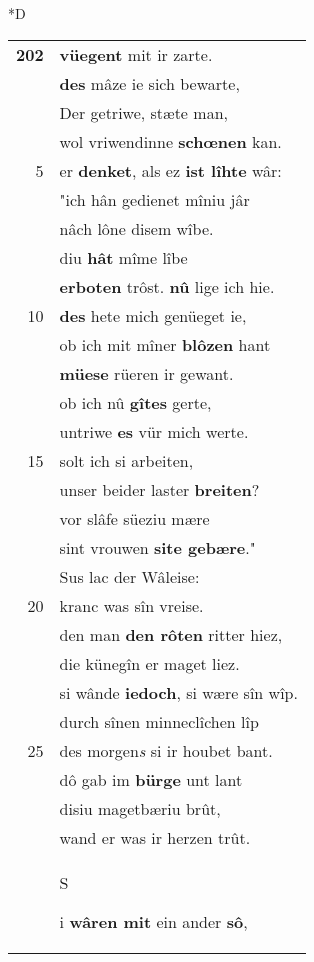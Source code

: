 \documentclass[8pt,a4paper,notitlepage]{article}
\begin{document}
\begin{table}[ht]
\begin{minipage}[t]{0.5\linewidth}
\small
\begin{center}*D
\end{center}
\begin{tabular}{rl}
\textbf{202} & \textbf{vüegent} mit ir zarte.\\ 
 & \textbf{des} mâze ie sich bewarte,\\ 
 & Der getriwe, stæte man,\\ 
 & wol vriwendinne \textbf{schœnen} kan.\\ 
5 & er \textbf{denket}, als ez \textbf{ist lîhte} wâr:\\ 
 & "ich hân gedienet mîniu jâr\\ 
 & nâch lône disem wîbe.\\ 
 & diu \textbf{hât} mîme lîbe\\ 
 & \textbf{erboten} trôst. \textbf{nû} lige ich hie.\\ 
10 & \textbf{des} hete mich genüeget ie,\\ 
 & ob ich mit mîner \textbf{blôzen} hant\\ 
 & \textbf{müese} rüeren ir gewant.\\ 
 & ob ich nû \textbf{gîtes} gerte,\\ 
 & untriwe \textbf{es} vür mich werte.\\ 
15 & solt ich si arbeiten,\\ 
 & unser beider laster \textbf{breiten}?\\ 
 & vor slâfe süeziu mære\\ 
 & sint vrouwen \textbf{site gebære}."\\ 
 & Sus lac der Wâleise:\\ 
20 & kranc was sîn vreise.\\ 
 & den man \textbf{den rôten} ritter hiez,\\ 
 & die künegîn er maget liez.\\ 
 & si wânde \textbf{iedoch}, si wære sîn wîp.\\ 
 & durch sînen minneclîchen lîp\\ 
25 & des morgen\textit{s} si ir houbet bant.\\ 
 & dô gab im \textbf{bürge} unt lant\\ 
 & disiu magetbæriu brût,\\ 
 & wand er was ir herzen trût.\\ 
 & \begin{large}S\end{large}i \textbf{wâren mit} ein ander \textbf{sô},\\ 

\end{tabular}
\end{minipage}
\end{table}
\end{document}
